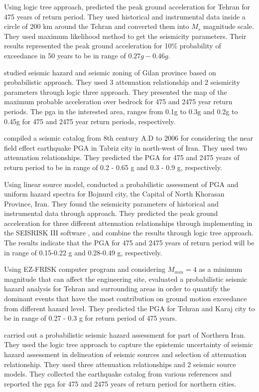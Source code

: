 Using logic tree approach,\citet{Ghodrati2003} predicted the peak ground acceleration for Tehran for 475 years of return period. They used historical and instrumental data inside a circle of 200 km around the Tehran and converted them into $M_s$ magnitude scale. They used maximum likelihood method to get the seismicity parameters. Their results represented the peak ground acceleration for 10\% probability of exceedance in 50 years to be in range of $0.27g - 0.46g$.

\citet{Ghodrati2008} studied seismic hazard and seismic zoning of Gilan province based on probabilistic approach. They used 3 attenuation relationship and 2 seismicity parameters through logic three approach. They presented the map of the maximum probable acceleration over bedrock for 475 and 2475 year return periods. The pga in the interested area, ranges from 0.1g to 0.3g and 0.2g to 0.45g for 475 and 2475 year return periods, respectively. 

\citet{Vafaie2011} compiled a seismic catalog from 8th century A.D to 2006 for considering the near field effect earthquake PGA in Tabriz city in north-west of Iran. They used two attenuation relationships. They predicted the PGA for 475 and 2475 years of return period to be in range of 0.2 - 0.65 g and 0.3 - 0.9 g, respectively.  

Using linear source model,\citet{Rahgozar2012} conducted a probabilistic assessment of PGA and uniform hazard spectra for Bojnurd city, the Capital of North Khorasan Province, Iran. They found the seismicity parameters of historical and instrumental data through \citet{Kijko2000} approach. They predicted the peak ground acceleration for three different attenuation relationships through implementing in the SEISRISK III software \citep{Bender1982}, and combine the results through logic tree approach. The results indicate that the PGA for 475 and 2475 years of return period will be in range of 0.15-0.22 g and 0.28-0.49 g, respectively.

Using  EZ-FRISK computer program and considering $M_{min} = 4$ as a minimum magnitude that can affect the engineering site, \citet{Abdi2013} evaluated a probabilistic seismic hazard analysis for Tehran and surrounding areas in order to quantify the dominant events that have the most contribution on ground motion exceedance from different hazard level. They predicted the PGA for Tehran and Karaj city to be in range of 0.27 - 0.3 g for return period of 475 years. 

\citet{Abdollahzadeh2014a} carried out a probabilistic seismic hazard assessment for part of Northern Iran. They used the logic tree approach to capture the epistemic uncertainty of seismic hazard assessment in delineation of seismic sources and selection of attenuation relationship. They used three attenuation relationships and 2 seismic source models. They collected the earthquake catalog from various references and reported the pga for 475 and 2475 years of return period for northern cities.   

